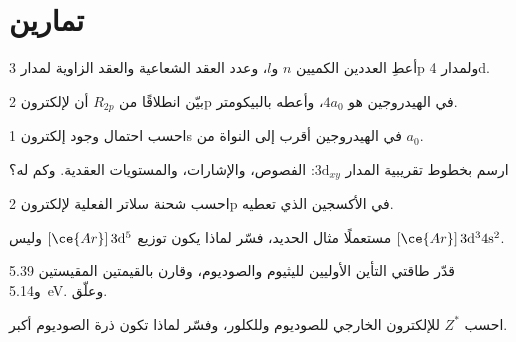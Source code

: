 \section{تمارين}

\begin{exercise}[$\star$]\label{exo:b2:atomic-orbitals:1}
أعطِ العددين الكميين $n$ و$l$، وعدد العقد الشعاعية والعقد الزاوية
لمدار 3p ولمدار 4d.
\end{exercise}

\begin{exercise}[$\star$]\label{exo:b2:atomic-orbitals:2}
بيّن انطلاقًا من $R_{2p}$ أن  لإلكترون 2p في الهيدروجين
هو $4a_0$، وأعطه بالبيكومتر.
\end{exercise}

\begin{exercise}[$\star$]\label{exo:b2:atomic-orbitals:3}
احسب احتمال وجود إلكترون 1s في الهيدروجين أقرب إلى
النواة من $a_0$.
\end{exercise}

\begin{exercise}[$\star$]\label{exo:b2:atomic-orbitals:4}
ارسم بخطوط تقريبية المدار $3\mathrm d_{xy}$: الفصوص، والإشارات، والمستويات العقدية. وكم
 له؟
\end{exercise}

\begin{exercise}[$\star\star$]\label{exo:b2:atomic-orbitals:5}
احسب شحنة سلاتر الفعلية لإلكترون 2p في الأكسجين  الذي تعطيه.
\end{exercise}

\begin{exercise}[$\star\star$]\label{exo:b2:atomic-orbitals:6}
مستعملًا مثال الحديد، فسّر لماذا يكون توزيع 
$[\ce{Ar}]\,3\mathrm d^5$ وليس $[\ce{Ar}]\,3\mathrm d^3 4\mathrm s^2$.
\end{exercise}

\begin{exercise}[$\star\star$]\label{exo:b2:atomic-orbitals:7}
قدّر  طاقتي التأين الأوليين لليثيوم والصوديوم،
وقارن بالقيمتين المقيستين 5.39 و\qty{5.14}{eV}. وعلّق.
\end{exercise}

\begin{exercise}[$\star\star$]\label{exo:b2:atomic-orbitals:8}
احسب $Z^*$  للإلكترون الخارجي للصوديوم
وللكلور، وفسّر لماذا تكون ذرة الصوديوم أكبر.
\end{exercise}

